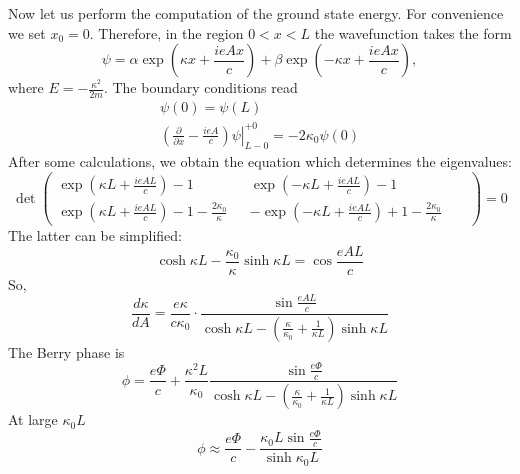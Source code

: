 \documentclass{article}
\begin{document}
Now let us perform the computation of the ground state energy. For convenience we set 
$x_0 = 0$. Therefore, in the region 
$0 < x < L$ the wavefunction takes the form
\begin{equation}
    \psi = \alpha\exp{\left(\kappa x +  \frac{ieAx}{c}\right)} + 
           \beta\exp{\left(-\kappa x + \frac{ieAx}{c}\right)},
\end{equation}
where $E = -\frac{\kappa^2}{2m}$. The boundary conditions read
\begin{equation}
    \begin{gathered}
        \psi(0) = \psi(L)\\
        \left. \left( \frac{\partial}{\partial x}-\frac{ieA}{c}\right)\psi\right|_{L-0}^{+0}=
        -2\kappa_0 \psi(0)
    \end{gathered}
\end{equation}
After some calculations, we obtain the equation which determines the eigenvalues:
\begin{equation}
   \operatorname{det}
        \begin{pmatrix}
            \exp{\left( \kappa L + \frac{ieAL}{c}\right)} - 1 &&
            \exp{\left(-\kappa L + \frac{ieAL}{c}\right)} - 1 \\
            \exp{\left( \kappa L + \frac{ieAL}{c}\right)} - 1 - \frac{2\kappa_0}{\kappa} &&
           -\exp{\left(-\kappa L + \frac{ieAL}{c}\right)} + 1 - \frac{2\kappa_0}{\kappa} &&
        \end{pmatrix} = 0
\end{equation}
The latter can be simplified:
\begin{equation}
    \cosh{\kappa L} - \frac{\kappa_0}{\kappa} \sinh{\kappa L} = \cos{\frac{eAL}{c}}
\end{equation}
So,
\begin{equation}
   \frac{d\kappa}{dA} = \frac{e\kappa}{c\kappa_0} \cdot
                        \frac{\sin\frac{eAL}{c}}
                                        {\cosh{\kappa L} - \left(\frac{\kappa}{\kappa_0} +
                                                 \frac{1}{\kappa L}\right)\sinh{\kappa L}}
\end{equation}
The Berry phase is
\begin{equation}
    \phi = \frac{e\Phi}{c} + \frac{\kappa^2 L}{\kappa_0} \frac{\sin\frac{e\Phi}{c}}
                {\cosh{\kappa L} - \left(\frac{\kappa}{\kappa_0} +
                \frac{1}{\kappa L}\right)\sinh{\kappa L}} 
\end{equation}
At large $\kappa_0 L$
\begin{equation}
    \phi \approx \frac{e\Phi}{c} - \frac{\kappa_0 L \sin\frac{e\Phi}{c}}{\sinh{\kappa_0 L}} 
\end{equation}
\end{document}
